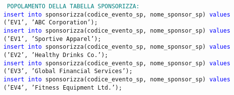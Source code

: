 \documentclass{article}
\begin{document}
    \begin{flushleft}
        \texttt{
        \textcolor{teal}{POPOLAMENTO DELLA TABELLA SPONSORIZZA:} \\
        \hspace*{0.5em}\textcolor{blue}{insert into} sponsorizza(codice\_evento\_sp, nome\_sponsor\_sp) \textcolor{blue}{values} ('EV1', 'ABC \hspace*{0.5em}Corporation'); \\
        \hspace*{0.5em}\textcolor{blue}{insert into} sponsorizza(codice\_evento\_sp, nome\_sponsor\_sp) \textcolor{blue}{values} ('EV1', \hspace*{0.5em}'Sportive Apparel'); \\
        \hspace*{0.5em}\textcolor{blue}{insert into} sponsorizza(codice\_evento\_sp, nome\_sponsor\_sp) \textcolor{blue}{values} ('EV2', \hspace*{0.5em}'Healthy Drinks Co.'); \\
        \hspace*{0.5em}\textcolor{blue}{insert into} sponsorizza(codice\_evento\_sp, nome\_sponsor\_sp) \textcolor{blue}{values} ('EV3', 'Global \hspace*{0.5em}Financial Services'); \\
        \hspace*{0.5em}\textcolor{blue}{insert into} sponsorizza(codice\_evento\_sp, nome\_sponsor\_sp) \textcolor{blue}{values} ('EV4', \hspace*{0.5em}'Fitness Equipment Ltd.'); \\}
    \end{flushleft}
\end{document}

